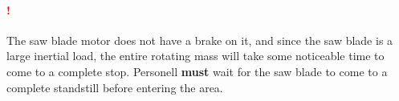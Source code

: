 \paragraph*{\textbf{{\LARGE \textcolor{red}{!}}}}The saw blade motor does not have a brake on it, and since the saw blade is a large inertial load, the entire rotating mass will take some noticeable time to come to a complete stop. Personell \textbf{must} wait for the saw blade to come to a complete standstill before entering the area.
